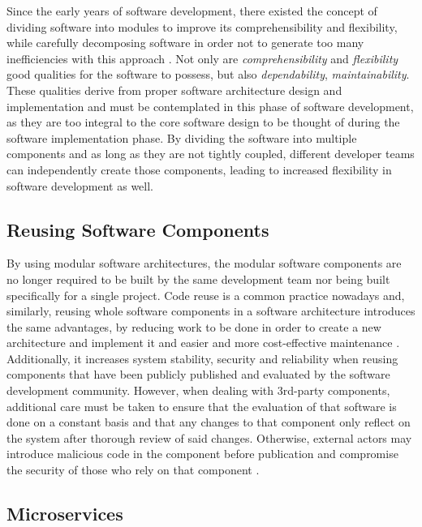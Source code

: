 Since the early years of software development, there existed the concept of dividing software into modules to improve its comprehensibility and flexibility, while carefully decomposing software in order not to generate too many inefficiencies with this approach \Parencite{parnas_1972}. Not only are \textit{comprehensibility} and \textit{flexibility} good qualities for the software to possess, but also \textit{dependability}, \textit{maintainability}. These qualities derive from proper software architecture design and implementation and must be contemplated in this phase of software development, as they are too integral to the core software design to be thought of during the software implementation phase. By dividing the software into multiple components and as long as they are not tightly coupled, different developer teams can independently create those components, leading to increased flexibility in software development as well.


\subsection{Reusing Software Components}\label{state-of-the-art:ss:reusing-software-components}

By using modular software architectures, the modular software components are no longer required to be built by the same development team nor being built specifically for a single project. 
Code reuse is a common practice nowadays and, similarly, reusing whole software components in a software architecture introduces the same advantages, by reducing work to be done in order to create a new architecture and implement it and easier and more cost-effective maintenance \Parencite{hasselbring2018software}. Additionally, it increases system stability, security and reliability when reusing components that have been publicly published and evaluated by the software development community. However, when dealing with 3rd-party components, additional care must be taken to ensure that the evaluation of that software is done on a constant basis and that any changes to that component only reflect on the system after thorough review of said changes. Otherwise, external actors may introduce malicious code in the component before publication and compromise the security of those who rely on that component \Parencite{tal_2022}.

\subsection{Microservices}\label{state-of-the-art:ss:microservices}

